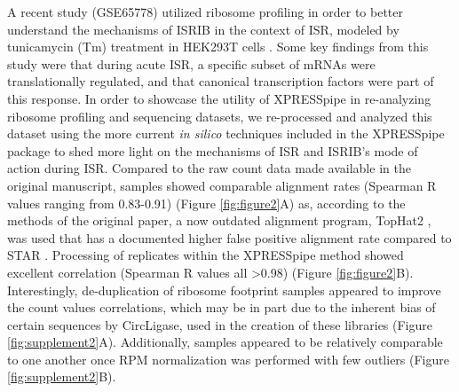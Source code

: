 \documentclass[11pt, a4paper, oneside]{article}
\begin{document}
A recent study (GSE65778) utilized ribosome profiling in order to better understand the mechanisms of ISRIB in the context of ISR, modeled by tunicamycin (Tm) treatment in HEK293T cells \cite{isrib_riboseq}. Some key findings from this study were that during acute ISR, a specific subset of mRNAs were translationally regulated, and that canonical transcription factors were part of this response. In order to showcase the utility of XPRESSpipe in re-analyzing ribosome profiling and sequencing datasets, we re-processed and analyzed this dataset using the more current \textit{in silico} techniques included in the XPRESSpipe package to shed more light on the mechanisms of ISR and ISRIB's mode of action during ISR. Compared to the raw count data made available in the original manuscript, samples showed comparable alignment rates (Spearman R values ranging from 0.83-0.91) (Figure \ref{fig:figure2}A) as, according to the methods of the original paper, a now outdated alignment program, TopHat2 \cite{tophat2}, was used that has a documented higher false positive alignment rate compared to STAR \cite{alignment_benchmark, star}. Processing of replicates within the XPRESSpipe method showed excellent correlation (Spearman R values all \textgreater 0.98) (Figure \ref{fig:figure2}B). Interestingly, de-duplication of ribosome footprint samples appeared to improve the count values correlations, which may be in part due to the inherent bias of certain sequences by CircLigase, used in the creation of these libraries \cite{circligase_bias, isrib_riboseq} (Figure \ref{fig:supplement2}A). Additionally, samples appeared to be relatively comparable to one another once RPM normalization was performed with few outliers (Figure \ref{fig:supplement2}B). \par
\end{document}
